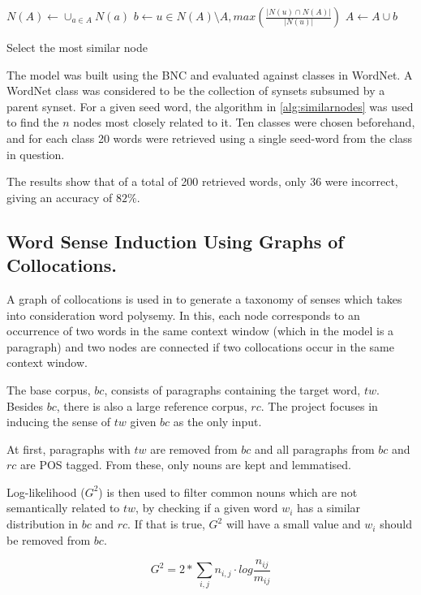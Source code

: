 \begin{algorithm}
 \begin{algorithmic}
  \State $N(A) \gets \cup_{a \in A} N(a)$
  \State $b \gets u \in N(A) \setminus A, max(\frac{|N(u) \cap N(A)|}{|N(u)|})$
  \State $A \gets A \cup b$
 \end{algorithmic}
 \caption{\label{alg:similarnodes} Select the most similar node}
\end{algorithm}

The model was built using the \ac{BNC} and evaluated against classes in
WordNet. A WordNet class was considered to be the collection of synsets
subsumed by a parent synset. For a given seed word, the algorithm in
\ref{alg:similarnodes} was used to find the $n$ nodes most closely related to
it. Ten classes were chosen beforehand, and for each class 20 words were
retrieved using a single seed-word from the class in question.

The results show that of a total of 200 retrieved words, only 36 were
incorrect, giving an accuracy of $82\%$.

\subsection{Word Sense Induction Using Graphs of Collocations.}
\label{sec:collocations}

A graph of collocations is used in \cite{klapaftis2008word} to generate a
taxonomy of senses which takes into consideration word polysemy. In this, each
node corresponds to an occurrence of two words in the same context window (which
in the model is a paragraph) and two nodes are connected if two collocations
occur in the same context window.

The base corpus, $bc$, consists of paragraphs containing the target word, $tw$.
Besides $bc$, there is also a large reference corpus, $rc$. The project focuses
in inducing the sense of $tw$ given $bc$ as the only input.

At first, paragraphs with $tw$ are removed from $bc$ and all paragraphs from
$bc$ and $rc$ are \ac{POS} tagged. From these, only nouns are kept and
lemmatised.

Log-likelihood ($G^2$) is then used to filter common nouns which are not
semantically related to $tw$, by checking if a given word $w_i$ has a similar
distribution in $bc$ and $rc$. If that is true, $G^2$ will have a small value
and $w_i$ should be removed from $bc$.

\begin{equation}\label{eq:g2}
 G^2 = 2 * \sum_{i,j} n_{i,j} \cdot log \frac{n_{ij}}{m_{ij}}
\end{equation}

